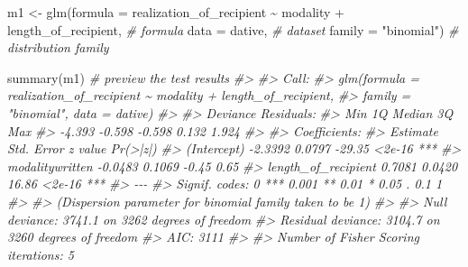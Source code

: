\documentclass[
]{article}
\newenvironment{Shaded}{\begin{snugshade}}{\end{snugshade}}
\newcommand{\AttributeTok}[1]{\textcolor[rgb]{0.77,0.63,0.00}{#1}}
\newcommand{\CommentTok}[1]{\textcolor[rgb]{0.56,0.35,0.01}{\textit{#1}}}
\newcommand{\FunctionTok}[1]{\textcolor[rgb]{0.00,0.00,0.00}{#1}}
\newcommand{\NormalTok}[1]{#1}
\newcommand{\OtherTok}[1]{\textcolor[rgb]{0.56,0.35,0.01}{#1}}
\newcommand{\SpecialCharTok}[1]{\textcolor[rgb]{0.00,0.00,0.00}{#1}}
\newcommand{\StringTok}[1]{\textcolor[rgb]{0.31,0.60,0.02}{#1}}
\begin{document}
\begin{Shaded}
\begin{Highlighting}[]
\NormalTok{m1 }\OtherTok{\textless{}{-}} \FunctionTok{glm}\NormalTok{(}\AttributeTok{formula =}\NormalTok{ realization\_of\_recipient }\SpecialCharTok{\textasciitilde{}}\NormalTok{ modality }\SpecialCharTok{+}\NormalTok{ length\_of\_recipient, }\CommentTok{\# formula}
          \AttributeTok{data =}\NormalTok{ dative, }\CommentTok{\# dataset}
          \AttributeTok{family =} \StringTok{"binomial"}\NormalTok{) }\CommentTok{\# distribution family}

\FunctionTok{summary}\NormalTok{(m1) }\CommentTok{\# preview the test results}
\CommentTok{\#\textgreater{} }
\CommentTok{\#\textgreater{} Call:}
\CommentTok{\#\textgreater{} glm(formula = realization\_of\_recipient \textasciitilde{} modality + length\_of\_recipient, }
\CommentTok{\#\textgreater{}     family = "binomial", data = dative)}
\CommentTok{\#\textgreater{} }
\CommentTok{\#\textgreater{} Deviance Residuals: }
\CommentTok{\#\textgreater{}    Min      1Q  Median      3Q     Max  }
\CommentTok{\#\textgreater{} {-}4.393  {-}0.598  {-}0.598   0.132   1.924  }
\CommentTok{\#\textgreater{} }
\CommentTok{\#\textgreater{} Coefficients:}
\CommentTok{\#\textgreater{}                     Estimate Std. Error z value Pr(\textgreater{}|z|)    }
\CommentTok{\#\textgreater{} (Intercept)          {-}2.3392     0.0797  {-}29.35   \textless{}2e{-}16 ***}
\CommentTok{\#\textgreater{} modalitywritten      {-}0.0483     0.1069   {-}0.45     0.65    }
\CommentTok{\#\textgreater{} length\_of\_recipient   0.7081     0.0420   16.86   \textless{}2e{-}16 ***}
\CommentTok{\#\textgreater{} {-}{-}{-}}
\CommentTok{\#\textgreater{} Signif. codes:  0 \textquotesingle{}***\textquotesingle{} 0.001 \textquotesingle{}**\textquotesingle{} 0.01 \textquotesingle{}*\textquotesingle{} 0.05 \textquotesingle{}.\textquotesingle{} 0.1 \textquotesingle{} \textquotesingle{} 1}
\CommentTok{\#\textgreater{} }
\CommentTok{\#\textgreater{} (Dispersion parameter for binomial family taken to be 1)}
\CommentTok{\#\textgreater{} }
\CommentTok{\#\textgreater{}     Null deviance: 3741.1  on 3262  degrees of freedom}
\CommentTok{\#\textgreater{} Residual deviance: 3104.7  on 3260  degrees of freedom}
\CommentTok{\#\textgreater{} AIC: 3111}
\CommentTok{\#\textgreater{} }
\CommentTok{\#\textgreater{} Number of Fisher Scoring iterations: 5}
\end{Highlighting}
\end{Shaded}
\end{document}
